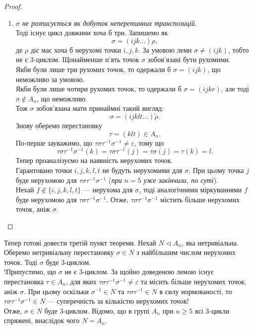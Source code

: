 \documentclass{math_library}
\begin{document}
\begin{proof}
\begin{enumerate}[wide=0pt,label={\Roman*.}]
\item \textit{$\sigma$ не розписується як добуток неперетинних транспозицій}.\\
Тоді існує цикл довжини хоча б три. Запишемо як 
\[
\sigma = (ijk \dots) \rho,
\]
де $\rho$ діє має хоча б нерухомі точки $i,j,k$. За умовою леми $\sigma \neq (ijk)$, тобто не є 3-циклом. Щонайменше п'ять точок $\sigma$ зобов'язані бути рухомими.\\
Якби були лише три рухомих точок, то одержали б $\sigma = (ijk)$, що неможливо за умовою.\\
Якби були лише чотири рухомих точок, то одержали б $\sigma = (ijkr)$, але тоді $\sigma \notin A_n$, що неможливо.\\
Тож $\sigma$ зобов'язана мати принаймні такий вигляд:
\[
\sigma = (ijklt \dots) \tilde{\rho}.
\]
Знову оберемо перестановку
\[
\tau = (klt) \in A_n.
\]
По-перше зауважимо, що $\tau \sigma \tau^{-1} \sigma^{-1} \neq \varepsilon$, тому що
\[
\tau \sigma \tau^{-1} \sigma^{-1}(k) = \tau \sigma \tau^{-1} (j) = \tau \sigma (j) = \tau (k) = l.
\]
Тепер проаналізуємо на наявність нерухомих точок.\\
Гарантовано точки $i,j,k,l,t$ не будуть нерухомими для $\sigma$. При цьому точка $j$ буде нерухомою для $\tau \sigma \tau^{-1} \sigma^{-1}$ (\textit{при $n = 5$ уже закінчили, по суті}).\\
Нехай $f \notin \{i,j,k,l,t\}$ --- нерухома для $\sigma$, тоді аналогічними міркуваннями $f$ буде нерухомою для $\tau \sigma \tau^{-1} \sigma^{-1}$. Отже, $\tau \sigma \tau^{-1} \sigma^{-1}$ містить більше нерухомих точок, аніж $\sigma$. \qedhere
\end{enumerate}
\end{proof}

Тепер готові довести третій пункт теореми. Нехай $N \triangleleft A_n$, яка нетривіальна. Оберемо нетривіальну перестановку $\sigma \in N$ з найбільшим числом нерухомих точок. Тоді $\sigma$ буде $3$-циклом.\\
!Припустимо, що $\sigma$ не є $3$-циклом. За щойно доведеною лемою існує перестановка $\tau \in A_n$, для яких $\tau \sigma \tau^{-1} \sigma^{-1} \neq \varepsilon$ та місить більше нерухомих точок, аніж $\sigma$. При цьому оскільки $\sigma^{-1} \in N$ та $\tau \sigma \tau^{-1} \in N$ в силу нормованості, то $\tau \sigma \tau^{-1} \sigma^{-1} \in N$ --- суперечність за кількістю нерухомих точок!\\
Отже, $\sigma \in N$ буде $3$-циклом. Відомо, що в групі $A_n$ при $n \geq 5$ всі $3$-цикли спряжені, внаслідок чого $N = A_n$.
\end{document}
